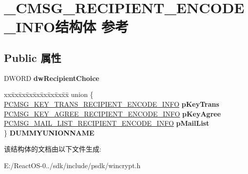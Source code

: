 \hypertarget{struct___c_m_s_g___r_e_c_i_p_i_e_n_t___e_n_c_o_d_e___i_n_f_o}{}\section{\+\_\+\+C\+M\+S\+G\+\_\+\+R\+E\+C\+I\+P\+I\+E\+N\+T\+\_\+\+E\+N\+C\+O\+D\+E\+\_\+\+I\+N\+F\+O结构体 参考}
\label{struct___c_m_s_g___r_e_c_i_p_i_e_n_t___e_n_c_o_d_e___i_n_f_o}
\subsection*{Public 属性}
\begin{DoxyCompactItemize}
\item 
\mbox{\label{struct___c_m_s_g___r_e_c_i_p_i_e_n_t___e_n_c_o_d_e___i_n_f_o_a0b43ddf3e2e246bbfa879cfde2a67b3c}} 
D\+W\+O\+RD {\bfseries dw\+Recipient\+Choice}
\item 
\mbox{\label{struct___c_m_s_g___r_e_c_i_p_i_e_n_t___e_n_c_o_d_e___i_n_f_o_a3b9a3390411a139e98715be9b3f56665}} 
\begin{tabbing}
xx\=xx\=xx\=xx\=xx\=xx\=xx\=xx\=xx\=\kill
union \{\\
\>\hyperlink{struct___c_m_s_g___k_e_y___t_r_a_n_s___r_e_c_i_p_i_e_n_t___e_n_c_o_d_e___i_n_f_o}{PCMSG\_KEY\_TRANS\_RECIPIENT\_ENCODE\_INFO} {\bfseries pKeyTrans}\\
\>\hyperlink{struct___c_m_s_g___k_e_y___a_g_r_e_e___r_e_c_i_p_i_e_n_t___e_n_c_o_d_e___i_n_f_o}{PCMSG\_KEY\_AGREE\_RECIPIENT\_ENCODE\_INFO} {\bfseries pKeyAgree}\\
\>\hyperlink{struct___c_m_s_g___m_a_i_l___l_i_s_t___r_e_c_i_p_i_e_n_t___e_n_c_o_d_e___i_n_f_o}{PCMSG\_MAIL\_LIST\_RECIPIENT\_ENCODE\_INFO} {\bfseries pMailList}\\
\} {\bfseries DUMMYUNIONNAME}\\

\end{tabbing}\end{DoxyCompactItemize}


该结构体的文档由以下文件生成\+:\begin{DoxyCompactItemize}
\item 
E\+:/\+React\+O\+S-\/0../sdk/include/psdk/wincrypt.\+h\end{DoxyCompactItemize}
